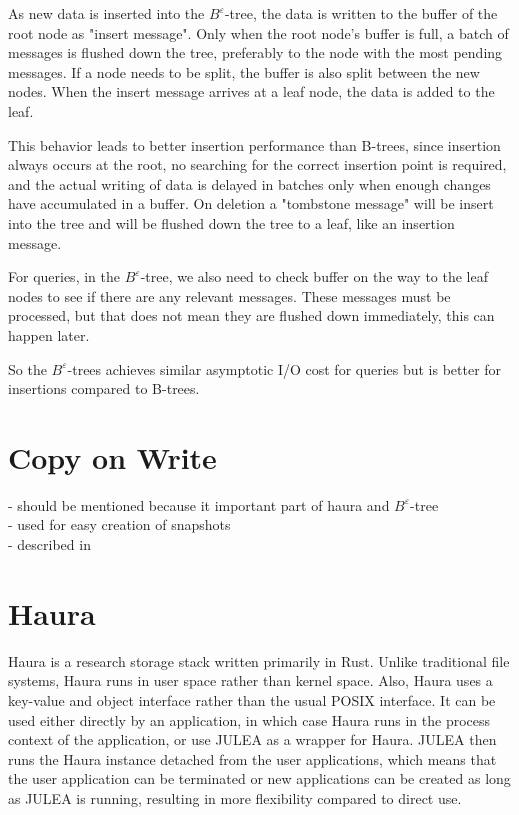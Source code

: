 \documentclass[
	12pt,
	a4paper,
	abstract,
	bibliography=totoc,
	chapterprefix,
	headings=openright,
	numbers=endperiod,
	parskip=half,
	twoside,
]{scrreprt}
\begin{document}
As new data is inserted into the $B^{\varepsilon}$-tree, the data is written to the buffer of the root node as "insert message".
Only when the root node's buffer is full, a batch of messages is flushed down the tree, preferably to the node with the most pending messages. 
If a node needs to be split, the buffer is also split between the new nodes.
When the insert message arrives at a leaf node, the data is added to the leaf.

This behavior leads to better insertion performance than B-trees, since insertion always occurs at the root, no searching for the correct insertion point is required, and  
the actual writing of data is delayed in batches only when enough changes have accumulated in a buffer.
On deletion a "tombstone message" will be insert into the tree and will be flushed down the tree to a leaf, like an insertion message.

For queries, in the $B^{\varepsilon}$-tree, we also need to check buffer on the way to the leaf nodes to see if there are any relevant messages.
These messages must be processed, but that does not mean they are flushed down immediately, this can happen later.

So the $B^{\varepsilon}$-trees achieves similar asymptotic I/O cost for queries but is better for insertions compared to B-trees.

\section{Copy on Write}
\label{sec:copy on write}

- should be mentioned because it important part of haura and $B^{\varepsilon}$-tree\\
- used for easy creation of snapshots \\
- described in \cite{patterson1995informed}\\

\section{Haura}
\label{sec:haura}

Haura is a research storage stack written primarily in Rust.
Unlike traditional file systems, Haura runs in user space rather than kernel space.
Also, Haura uses a key-value and object interface rather than the usual POSIX interface.
It can be used either directly by an application, in which case Haura runs in the process context of the application, or
use JULEA as a wrapper for Haura.
JULEA then runs the Haura instance detached from the user applications, which means that the user application can be terminated or new applications can be created as long as JULEA is running, resulting in more flexibility compared to direct use.
\end{document}
